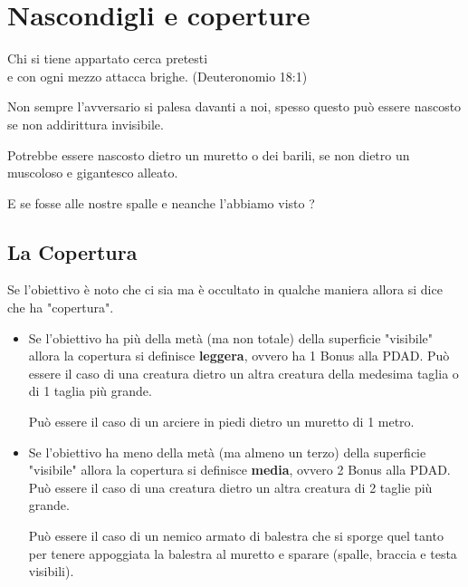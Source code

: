 \documentclass[12pt,a4paper,twoside,openany]{book}
\begin{document}
\pagebreak

\pagebreak

\section{Nascondigli e coperture} \hypertarget{coperture}{}

\begin{changemargin}{0.3cm}{0.3cm}\begin{enfasi}{
Chi si tiene appartato cerca pretesti\\
e con ogni mezzo attacca brighe. (Deuteronomio 18:1)
}\end{enfasi}\end{changemargin}\medskip

\begin{multicols}{2}
	
Non sempre l'avversario si palesa davanti a noi, spesso questo può essere nascosto se non addirittura invisibile.
	
Potrebbe essere nascosto dietro un muretto o dei barili, se non dietro un muscoloso e gigantesco alleato.

E se fosse alle nostre spalle e neanche l'abbiamo visto ?
	
\subsection{La Copertura}\label{copertura}
	
Se l'obiettivo è noto che ci sia ma è occultato in qualche maniera allora si dice che ha "copertura".
	
\begin{itemize}
\item
Se l'obiettivo ha più della metà (ma non totale) della superficie "visibile" allora la copertura si definisce \textbf{leggera}, ovvero ha 1 Bonus alla PDAD. Può essere il caso di una creatura dietro un altra creatura della medesima taglia o di 1 taglia più grande.
		
Può essere il caso di un arciere in piedi dietro un muretto di 1 metro.
		
\item
Se l'obiettivo ha meno della metà (ma almeno un terzo) della superficie "visibile" allora la copertura si definisce \textbf{media}, ovvero 2 Bonus alla PDAD. Può essere il caso di una creatura dietro un altra creatura di 2 taglie più grande.
		
Può essere il caso di un nemico armato di balestra che si sporge quel tanto per tenere appoggiata la balestra al muretto e sparare (spalle, braccia e testa visibili).
		

\end{itemize}
\end{multicols}
\end{document}
